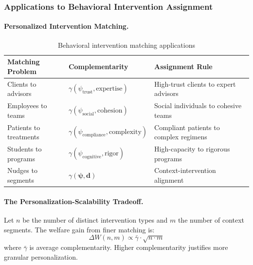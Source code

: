 \subsubsection{Applications to Behavioral Intervention Assignment}

\paragraph{Personalized Intervention Matching.}

\begin{table}[h]
\centering
\small
\begin{tabular}{p{3cm}p{4cm}p{5cm}}
\toprule
\textbf{Matching Problem} & \textbf{Complementarity} & \textbf{Assignment Rule} \\
\midrule
Clients to advisors & $\gamma(\psi_{\text{trust}}, \text{expertise})$ & High-trust clients to expert advisors \\
Employees to teams & $\gamma(\psi_{\text{social}}, \text{cohesion})$ & Social individuals to cohesive teams \\
Patients to treatments & $\gamma(\psi_{\text{compliance}}, \text{complexity})$ & Compliant patients to complex regimens \\
Students to programs & $\gamma(\psi_{\text{cognitive}}, \text{rigor})$ & High-capacity to rigorous programs \\
Nudges to segments & $\gamma(\boldsymbol{\psi}, \mathbf{d})$ & Context-intervention alignment \\
\bottomrule
\end{tabular}
\caption{Behavioral intervention matching applications}
\label{tab:matching-applications}
\end{table}

\paragraph{The Personalization-Scalability Tradeoff.}

\begin{proposition}
\label{prop:granularity}
Let $n$ be the number of distinct intervention types and $m$ the number of context 
segments. The welfare gain from finer matching is:
\begin{equation}
\Delta W(n, m) \propto \bar{\gamma} \cdot \sqrt{n \cdot m}
\end{equation}
where $\bar{\gamma}$ is average complementarity. Higher complementarity justifies 
more granular personalization.
\end{proposition}

